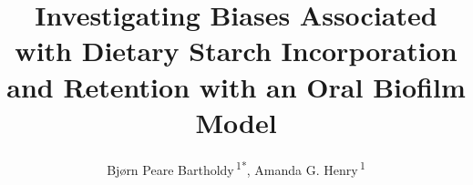 \documentclass[utf8]{../templates/frontiersSCNS}
\def\Authors{
  Bjørn Peare Bartholdy\,\textsuperscript{1*},
  Amanda G. Henry\,\textsuperscript{1}}
\def\firstAuthorLast{BARTHOLDY {et~al.}}
\begin{document}
\onecolumn
{}


\title[Biases Associated with Starch Incorporation]{Investigating Biases Associated with Dietary Starch Incorporation and Retention with an Oral Biofilm Model}
\author[\firstAuthorLast]{\Authors}
\address{} %
\correspondance{} %

\extraAuth{}%


\maketitle
\end{document}
